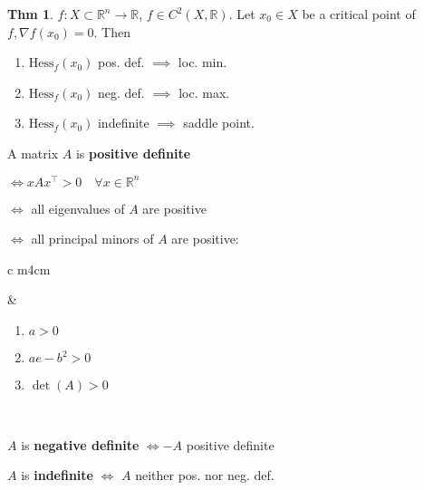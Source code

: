 \documentclass[a4paper, 10pt]{article}
\theoremstyle{definition}
\newtheorem*{theorem}{Thm}
\newcommand{\R}{\mathbb{R}}
\newcommand{\Hess}{\text{Hess}}
\begin{document}
\begin{theorem}
    \(f: X \subset \R^n \to \R\), \(f \in C^2(X, \R)\). Let \(x_0 \in X\) be a critical point of \(f, \nabla f(x_0) = 0\). Then
    \begin{enumerate}
        \item \(\Hess_f(x_0)\) pos. def. \(\implies\) loc. min.
        \item \(\Hess_f(x_0)\) neg. def. \(\implies\) loc. max.
        \item \(\Hess_f(x_0)\) indefinite \(\implies\) saddle point.
    \end{enumerate}
\end{theorem}

\begin{note*}
    A matrix \(A\) is \textbf{positive definite}
    
    \(\iff xAx^\top > 0 \quad \forall x \in \R^n\)

    \(\iff\) all eigenvalues of \(A\) are positive

    \(\iff\) all principal minors of \(A\) are positive:

    \begin{tabular}{c m{4cm}}
        & \begin{enumerate}
            \vspace{15pt}
            \item \(a > 0\)
            \item \(ae - b^2 > 0\)
            \item \(\det(A) > 0\)
        \end{enumerate} \\
    \end{tabular}

    \(A\) is \textbf{negative definite} \(\iff -A\) positive definite

    \(A\) is \textbf{indefinite} \(\iff\) \(A\) neither pos. nor neg. def.
\end{note*}
\end{document}
